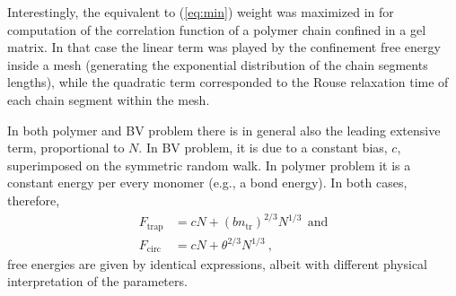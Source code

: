 \documentclass[aps,pre,floatfix,twocolumn,nofootinbib]{revtex4-2}
\newcommand{\be}{\begin{equation}}
\newcommand{\ee}{\end{equation}}
\newcommand{\eq}[1]{(\ref{#1})}
\begin{document}
Interestingly, the equivalent to \eq{eq:min} weight was maximized in \cite{Muthukumar:2018} for computation of the correlation function of a polymer chain confined in a gel matrix. In that case the linear term was played by the confinement free energy inside a mesh (generating the exponential distribution of the chain segments lengths), while the quadratic term corresponded to the Rouse relaxation time of each chain segment within the mesh.


In both polymer and BV problem there is in general also the leading extensive term, proportional to $N$.  In BV problem, it is due to a constant bias, $c$, superimposed on the symmetric random walk.  In polymer problem it is a constant energy per every monomer (e.g., a bond energy).  In both cases, therefore,
\be \begin{split}
F_{\mathrm{trap}} & = c N + \left( b n_{\mathrm{tr}} \right)^{2/3} N^{1/3} \ \ \mathrm{and} \\ F_{\mathrm{circ}} & = c N + \theta^{2/3} N^{1/3}  \ , \end{split} \label{eq:identical_free_energies}
\ee
free energies are given by identical expressions, albeit with different physical interpretation of the parameters.
\end{document}
